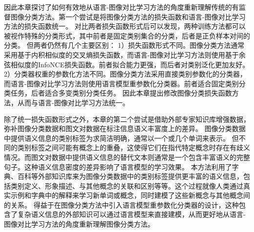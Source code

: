 因此本章探讨了如何有效地从语言-图像对比学习方法的角度重新理解传统的有监督图像分类方法。第一个尝试是将图像分类方法的损失函数和语言-图像对比学习方法的损失函数统一。
对比两者损失函数形式后可以发现，两种训练方法都可以被视作特殊的分类形式，其中前者是固定类别集合的分类，后者是正负样本对间的分类。
但两者仍然有几个主要区别：
1）损失函数形式不同。图像分类方法通常采用基于内积相似度的交叉熵损失函数，而语言-图像对比学习方法则使用基于余弦相似度的InfoNCE损失函数\cite{oord2018representation}。前者拟合能力更强，而后者对类别泛化更加友好。
2）分类器权重的参数化方法不同。图像分类方法采用直接类别参数化的分类器，而语言-图像对比学习方法则使用语言模型重参数化分类器。前者适合固定类别分类任务，后者适合多变类别分类任务。
因此本章提出修改图像分类损失函数方法，从而与语言-图像对比学习方法统一。

除了统一损失函数形式之外，本章的第二个尝试是借助外部专家知识库增强数据，弥补图像分类数据和图文对数据在标注信息语义丰富度上的差异。
图像分类数据中提供语义信息的类别标签为求简洁明确，通常以一个或几个单词来表示。
但不同的类别标签之间可能有概念上的重叠，这使得它们在指代特定概念时存在有歧义情况。而图文对数据中提供语义信息的替代文本则通常是一个包含丰富语义的完整句子。这种语义信息密度的差异影响了语言模型的学习效果。
本方法利用了字典、百科等外部知识库来为图像分类数据中的类别标签提供更丰富的语义信息，包括类别定义、形象描述、与其他概念的关联和区别等等。这个过程就像人类通过真实示例和字典中的解释来学习新单词或概念，同时建模了这些新概念与其他概念间的关系。
得益于在图像分类方法中引入语言模型重参数化分类器的设计，这种包含了复杂语义信息的外部知识可以通过语言模型来直接建模，从而更好地从语言-图像对比学习方法的角度重新理解图像分类方法。

